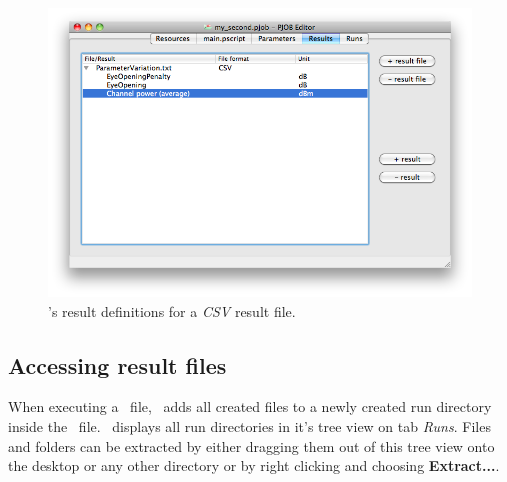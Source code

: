 \begin{figure}[h!]
\includegraphics[width=\textwidth]{Screenshots/PJobEditor/results_csv.png}
\caption{\pjobeditor's result definitions for a \textit{CSV} result file.}
\label{editor:results_csv}
\end{figure}




\subsection{Accessing result files}
When executing a \PJOB\ file, \PHO\ adds all created files to a newly created run directory inside the \PJOB\ file.
\pjobeditor\ displays all run directories in it's tree view on tab \textit{Runs}.
Files and folders can be extracted by either dragging them out of this tree view onto the desktop or any other directory
or by right clicking and choosing \textbf{Extract...}.


